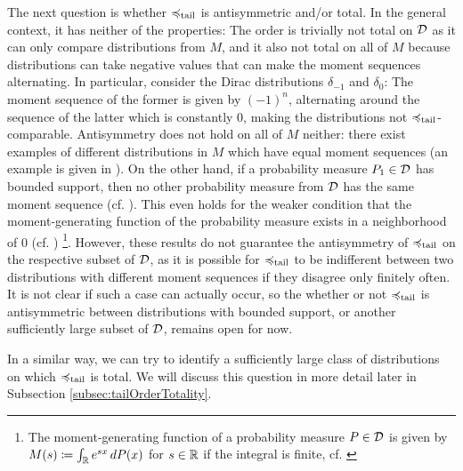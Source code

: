 \documentclass[a4paper]{scrreprt}
\newcommand{\M}{M}
\theoremstyle{definition}
\begin{document}
    The next question is whether $\preccurlyeq_{\text{tail}}$ is antisymmetric and/or total.
    In the general context, it has neither of the properties: The order is trivially not total on $\mathcal{D}$ as it can only compare distributions from $M$, and it also not total on all of $M$ because distributions can take negative values that can make the moment sequences alternating. In particular, consider the Dirac distributions $\delta_{-1}$ and $\delta_{0}$: The moment sequence of the former is given by $(-1)^n$, alternating around the sequence of the latter which is constantly $0$, making the distributions not $\preccurlyeq_{\text{tail}}$-comparable.
    Antisymmetry does not hold on all of $M$ neither: there exist examples of different distributions in $\M$ which have equal moment sequences (an example is given in \cite[Example 3.15]{bib:romanoCounterexamplesInProbability}).
    On the other hand, if a probability measure $P_1 \in \mathcal{D}$ has bounded support, then no other probability measure from $\mathcal{D}$ has the same moment sequence (cf. \cite[Corollary 4.2]{bib:schmuedgenTheMomentProblem}).
    This even holds for the weaker condition that the moment-generating function of the probability measure exists in a neighborhood of 0 (cf. \cites[Lemma 2.3]{bib:rassGameRiskManagI}[p.414]{bib:billingsleyProbabilityAndMeasure})
     \footnote{The moment-generating function of a probability measure $P \in \mathcal{D}$ is given by $M(s) \coloneqq \int_{\mathbb{R}} e^{sx} \, dP(x)$ for $s \in \mathbb{R}$ if the integral is finite, cf. \cite[(21.21)]{bib:billingsleyProbabilityAndMeasure}}.
    However, these results do not guarantee the antisymmetry of $\preccurlyeq_{\text{tail}}$ on the respective subset of $\mathcal{D}$, as it is possible for $\preccurlyeq_{\text{tail}}$ to be indifferent between two distributions with different moment sequences if they disagree only finitely often. It is not clear if such a case can actually occur, so the whether or not $\preccurlyeq_{\text{tail}}$ is antisymmetric between distributions with bounded support, or another sufficiently large subset of $\mathcal{D}$, remains open for now.
    
    
    In a similar way, we can try to identify a sufficiently large class of distributions on which $\preccurlyeq_{\text{tail}}$ is total. We will discuss this question in more detail later in Subsection \ref{subsec:tailOrderTotality}.
    
\end{document}
